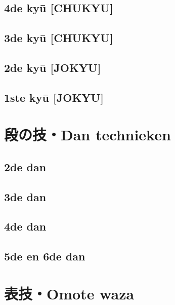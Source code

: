 \documentclass[a4paper, 12pt]{article}
\begin{document}
\newpage
\subsection{4de ky\={u} [CHUKYU]}


\newpage
\subsection{3de ky\={u} [CHUKYU]}


\newpage
\subsection{2de ky\={u} [JOKYU]}


\newpage
\subsection{1ste ky\={u} [JOKYU]}


\newpage
\section{段の技・Dan technieken}


\newpage
\subsection{2de dan}


\newpage
\subsection{3de dan}


\newpage
\subsection{4de dan}


\newpage
\subsection{5de en 6de dan}


\section{表技・Omote waza}
\end{document}
